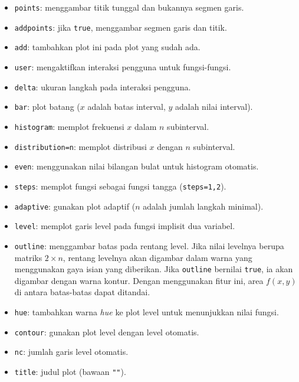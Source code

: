 \documentclass[a4paper,11pt,oneside]{scrbook}
\newenvironment{eulernotebook}{}{}
\newenvironment{eulercomment}{\par\medskip\noindent}{\par\medskip}
\begin{document}
\begin{eulernotebook}
\begin{eulercomment}
\begin{itemize}
    Untuk garis gunakan \texttt{"-"}, \texttt{"--"}, \texttt{"-."}, \texttt{"."}, \texttt{".-."}, \texttt{"-.-"}, \texttt{"->"}.
    Untuk poligon terisi atau plot batang gunakan \texttt{"\#"}, \texttt{"\#O"}, \texttt{"O"}, \texttt{"/"}, \texttt{"\textbackslash{}"}, \texttt{"\textbackslash{}/"}, \texttt{"+"}, \texttt{"|"}, \texttt{"-"}, \texttt{"t"}.
    \item \texttt{points}: menggambar titik tunggal dan bukannya segmen garis.
    \item \texttt{addpoints}: jika \texttt{true}, menggambar segmen garis dan titik.
    \item \texttt{add}: tambahkan plot ini pada plot yang sudah ada.
    \item \texttt{user}: mengaktifkan interaksi pengguna untuk fungsi-fungsi.
    \item \texttt{delta}: ukuran langkah pada interaksi pengguna.
    \item \texttt{bar}: plot batang ($x$ adalah batas interval, $y$ adalah nilai interval).
    \item \texttt{histogram}: memplot frekuensi $x$ dalam $n$ subinterval.
    \item \texttt{distribution=n}: memplot distribusi $x$ dengan $n$ subinterval.
    \item \texttt{even}: menggunakan nilai bilangan bulat untuk histogram otomatis.
    \item \texttt{steps}: memplot fungsi sebagai fungsi tangga (\texttt{steps=1,2}).
    \item \texttt{adaptive}: gunakan plot adaptif ($n$ adalah jumlah langkah minimal).
    \item \texttt{level}: memplot garis level pada fungsi implisit dua variabel.
    \item \texttt{outline}: menggambar batas pada rentang level. Jika nilai levelnya berupa matriks $2 \times n$, rentang levelnya akan digambar dalam warna yang menggunakan gaya isian yang diberikan. Jika \texttt{outline} bernilai \texttt{true}, ia akan digambar dengan warna kontur. Dengan menggunakan fitur ini, area $f(x,y)$ di antara batas-batas dapat ditandai.
    \item \texttt{hue}: tambahkan warna \emph{hue} ke plot level untuk menunjukkan nilai fungsi.
    \item \texttt{contour}: gunakan plot level dengan level otomatis.
    \item \texttt{nc}: jumlah garis level otomatis.
    \item \texttt{title}: judul plot (bawaan \texttt{""}).

\end{itemize}
\end{eulercomment}
\end{eulernotebook}
\end{document}
